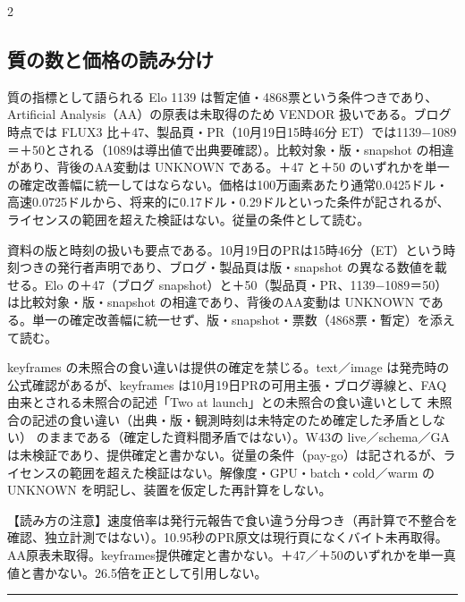 \documentclass[lualatex,a4paper,10pt]{jlreq}
\begin{document}
\begin{multicols}{2} %


\subsection*{質の数と価格の読み分け}


質の指標として語られる Elo 1139 は暫定値・4868票という条件つきであり、Artificial Analysis（AA）の原表は未取得のため VENDOR 扱いである。ブログ時点では FLUX3 比＋47、製品頁・PR（10月19日15時46分 ET）では1139−1089＝＋50とされる（1089は導出値で出典要確認）。比較対象・版・snapshot の相違があり、背後のAA変動は UNKNOWN である。＋47 と＋50 のいずれかを単一の確定改善幅に統一してはならない。価格は100万画素あたり通常0.0425ドル・高速0.0725ドルから、将来的に0.17ドル・0.29ドルといった条件が記されるが、ライセンスの範囲を超えた検証はない。従量の条件として読む。


資料の版と時刻の扱いも要点である。10月19日のPRは15時46分（ET）という時刻つきの発行者声明であり、ブログ・製品頁は版・snapshot の異なる数値を載せる。Elo の＋47（ブログ snapshot）と＋50（製品頁・PR、1139−1089＝50）は比較対象・版・snapshot の相違であり、背後のAA変動は UNKNOWN である。単一の確定改善幅に統一せず、版・snapshot・票数（4868票・暫定）を添えて読む。


keyframes の未照合の食い違いは提供の確定を禁じる。text／image は発売時の公式確認があるが、keyframes は10月19日PRの可用主張・ブログ導線と、FAQ由来とされる未照合の記述「Two at launch」との未照合の食い違いとして 未照合の記述の食い違い（出典・版・観測時刻は未特定のため確定した矛盾としない） のままである（確定した資料間矛盾ではない）。W43の live／schema／GA は未検証であり、提供確定と書かない。従量の条件（pay-go）は記されるが、ライセンスの範囲を超えた検証はない。解像度・GPU・batch・cold／warm の UNKNOWN を明記し、装置を仮定した再計算をしない。


\begin{tcolorbox}[colback=SurveySoft,colframe=SurveyRule,arc=1mm,boxrule=0.4pt,left=2mm,right=2mm]
【読み方の注意】速度倍率は発行元報告で食い違う分母つき（再計算で不整合を確認、独立計測ではない）。10.95秒のPR原文は現行頁になくバイト未再取得。AA原表未取得。keyframes提供確定と書かない。＋47／＋50のいずれかを単一真値と書かない。26.5倍を正として引用しない。

\end{tcolorbox}


\end{multicols} %
\bigskip\hrule\bigskip %
\end{document}
